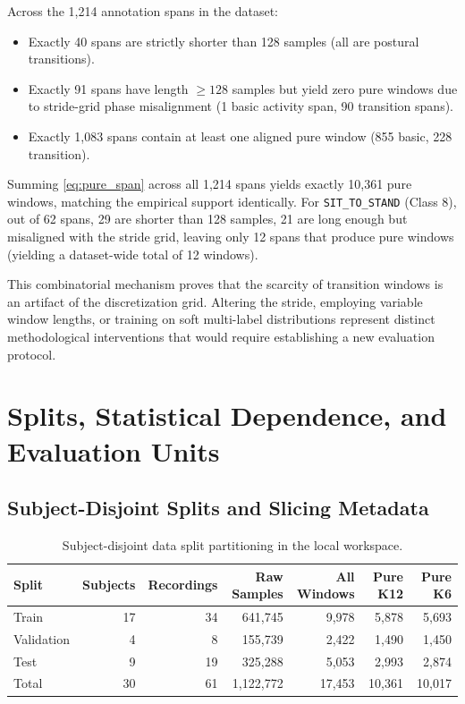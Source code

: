 \documentclass[11pt,a4paper]{article}
\newcommand{\code}[1]{{\small\ttfamily\nolinkurl{#1}}}
\theoremstyle{definition}
\begin{document}
Across the 1,214 annotation spans in the dataset:
\begin{itemize}
\item Exactly 40 spans are strictly shorter than 128 samples (all are postural transitions).
\item Exactly 91 spans have length $\ge 128$ samples but yield zero pure windows due to stride-grid phase misalignment (1 basic activity span, 90 transition spans).
\item Exactly 1,083 spans contain at least one aligned pure window (855 basic, 228 transition).
\end{itemize}
Summing \eqref{eq:pure_span} across all 1,214 spans yields exactly 10,361 pure windows, matching the empirical support identically. For \code{SIT_TO_STAND} (Class 8), out of 62 spans, 29 are shorter than 128 samples, 21 are long enough but misaligned with the stride grid, leaving only 12 spans that produce pure windows (yielding a dataset-wide total of 12 windows).

This combinatorial mechanism proves that the scarcity of transition windows is an artifact of the discretization grid. Altering the stride, employing variable window lengths, or training on soft multi-label distributions represent distinct methodological interventions that would require establishing a new evaluation protocol.

\section{Splits, Statistical Dependence, and Evaluation Units}

\subsection{Subject-Disjoint Splits and Slicing Metadata}
\begin{table}[htbp]\centering\small
\begin{tabular}{lrrrrrr}\toprule
Split & Subjects & Recordings & Raw Samples & All Windows & Pure K12 & Pure K6\\\midrule
Train & 17 & 34 & 641,745 & 9,978 & 5,878 & 5,693\\
Validation & 4 & 8 & 155,739 & 2,422 & 1,490 & 1,450\\
Test & 9 & 19 & 325,288 & 5,053 & 2,993 & 2,874\\\midrule
Total & 30 & 61 & 1,122,772 & 17,453 & 10,361 & 10,017\\\bottomrule
\end{tabular}
\caption{Subject-disjoint data split partitioning in the local workspace.}
\end{table}
\end{document}
